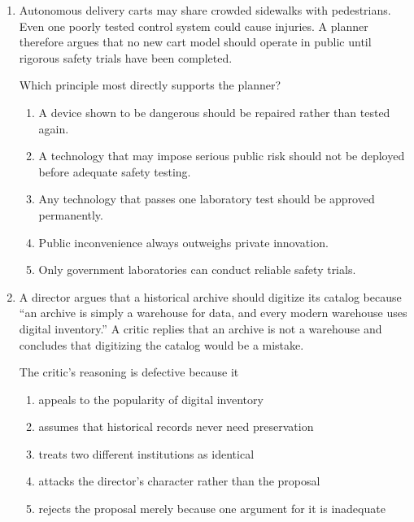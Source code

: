 \begin{enumerate}
The argument challenges the definition by
\begin{enumerate}
\item claiming that approval is impossible to measure
\item showing that everything new is automatically valuable
\item presenting a plausible creative case that lacks the stated motive
\item arguing that curiosity and approval are identical motives
\item appealing to the theorist's lack of mathematical expertise
\end{enumerate}

\item Autonomous delivery carts may share crowded sidewalks with pedestrians. Even one poorly tested control system could cause injuries. A planner therefore argues that no new cart model should operate in public until rigorous safety trials have been completed.

Which principle most directly supports the planner?
\begin{enumerate}
\item A device shown to be dangerous should be repaired rather than tested again.
\item A technology that may impose serious public risk should not be deployed before adequate safety testing.
\item Any technology that passes one laboratory test should be approved permanently.
\item Public inconvenience always outweighs private innovation.
\item Only government laboratories can conduct reliable safety trials.
\end{enumerate}

\item A director argues that a historical archive should digitize its catalog because ``an archive is simply a warehouse for data, and every modern warehouse uses digital inventory.'' A critic replies that an archive is not a warehouse and concludes that digitizing the catalog would be a mistake.

The critic's reasoning is defective because it
\begin{enumerate}
\item appeals to the popularity of digital inventory
\item assumes that historical records never need preservation
\item treats two different institutions as identical
\item attacks the director's character rather than the proposal
\item rejects the proposal merely because one argument for it is inadequate
\end{enumerate}


\end{enumerate}
